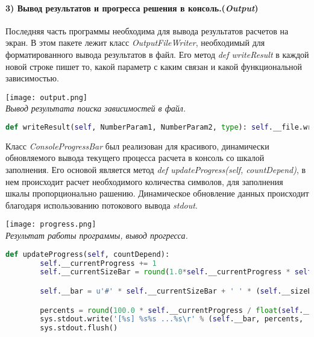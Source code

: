     \paragraph{3) Вывод результатов и прогресса решения в консоль.(\textit{Output})\\
    }
     Последняя часть программы необходима для вывода результатов расчетов на экран. В этом пакете лежит класс \textit{OutputFileWriter}, необходимый для форматированного вывода результатов в файл. Его метод \textit{def writeResult} в каждой новой строке пишет то, какой параметр с каким связан и какой функциональной зависимостью.

     \begin{center}
        \texttt{[image: output.png]}\\
        \textit{Вывод результата поиска зависимостей в файл.}
    \end{center}

     \begin{lstlisting}[language=Python]
        def writeResult(self, NumberParam1, NumberParam2, type): self.__file.write("Параметр " + str(NumberParam1) + " связан с параметром " + str(NumberParam2) +": Зависимость "+ type + "\n")
     \end{lstlisting}

     Класс \textit{ConsoleProgressBar} был реализован для красивого, динамически обновляемого вывода текущего процесса расчета в консоль со шкалой заполнения. Его основой является метод \textit{def updateProgress(self, countDepend)}, в нем происходит расчет необходимого количества символов, для заполнения шкалы пропорционально рашению. Динамическое обновление данных происходит благодаря использованию потокового вывода \textit{stdout}.

     \begin{center}
        \texttt{[image: progress.png]}\\
        \textit{Результат работы программы, вывод прогресса.}
    \end{center}


     \begin{lstlisting}[language=Python]
    def updateProgress(self, countDepend):
        self.__currentProgress += 1
        self.__currentSizeBar = round(1.0*self.__currentProgress * self.__sizeIterable)

        self.__bar = u'#' * self.__currentSizeBar + ' ' * (self.__sizeLine - self.__currentSizeBar)

        percents = round(100.0 * self.__currentProgress / float(self.__countIteration), 1)
        sys.stdout.write('[%s] %s%s ...%s\r' % (self.__bar, percents, '%', " Найдено зависимостей: "+str(countDepend)+" из "+ str(self.__currentProgress) + " проверенных. "))
        sys.stdout.flush()
     \end{lstlisting}


